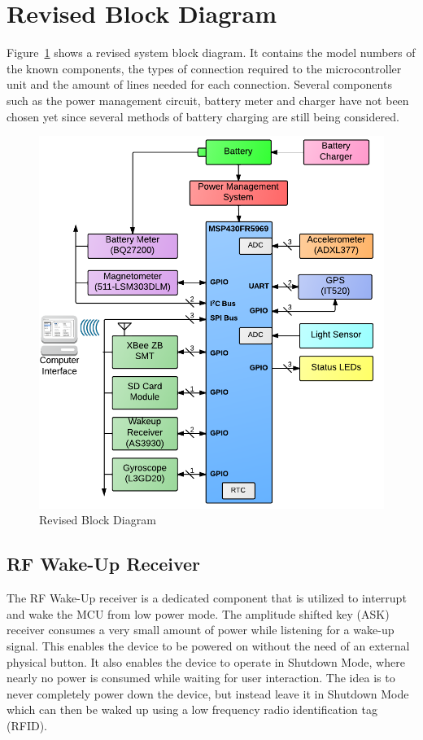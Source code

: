 \section{Revised Block Diagram}

Figure~\ref{fig:blockDiagram} shows a revised system block diagram.  It contains the model numbers of the known components, the types of connection required to the microcontroller unit and the amount of lines needed for each connection.  Several components such as the power management circuit, battery meter and charger have not been chosen yet since several methods of battery charging are still being considered.

\begin{figure}[H]
	\centering
	\includegraphics[width=\textwidth]{img/blockDiagramV2_2}
	\caption{Revised Block Diagram \label{fig:blockDiagram}}
\end{figure}

\subsection{RF Wake-Up Receiver}
The RF Wake-Up receiver is a dedicated component that is utilized to interrupt and wake the MCU from low power mode. The amplitude shifted key (ASK) receiver consumes a very small amount of power while listening for a wake-up signal. This enables the device to be powered on without the need of an external physical button. It also enables the device to operate in Shutdown Mode, where nearly no power is consumed while waiting for user interaction. The idea is to never completely power down the device, but instead leave it in Shutdown Mode which can then be waked up using a low frequency radio identification tag (RFID).

